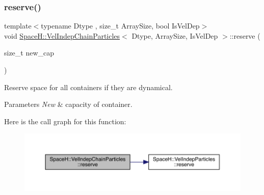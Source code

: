 \subsubsection{\texorpdfstring{reserve()}{reserve()}\hspace{0.1cm}{\footnotesize\ttfamily [1/2]}}
{\footnotesize\ttfamily template$<$typename Dtype , size\+\_\+t Array\+Size, bool Is\+Vel\+Dep$>$ \\
void \mbox{\hyperlink{class_space_h_1_1_vel_indep_chain_particles}{Space\+H\+::\+Vel\+Indep\+Chain\+Particles}}$<$ Dtype, Array\+Size, Is\+Vel\+Dep $>$\+::reserve (\begin{DoxyParamCaption}\item[{size\+\_\+t}]{new\+\_\+cap }\end{DoxyParamCaption})\hspace{0.3cm}{\ttfamily [inline]}}



Reserve space for all containers if they are dynamical. 


\begin{DoxyParams}{Parameters}
{\em New} & capacity of container. \\
\hline
\end{DoxyParams}
Here is the call graph for this function\+:
\nopagebreak
\begin{figure}[H]
\begin{center}
\leavevmode
\includegraphics[width=350pt]{class_space_h_1_1_vel_indep_chain_particles_a9a6b23671b53391cded80cde58b18608_cgraph}
\end{center}
\end{figure}
\mbox{\label{class_space_h_1_1_vel_indep_chain_particles_a9a6b23671b53391cded80cde58b18608}} 
